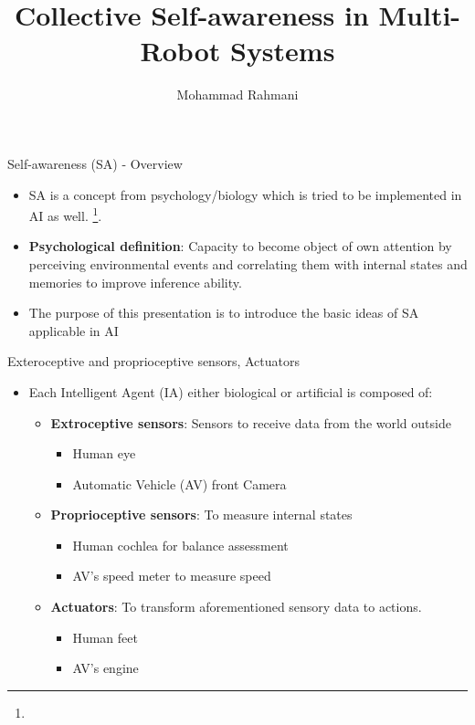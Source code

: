 \documentclass[unknownkeysallowed]{beamer}
\title{Collective Self-awareness in Multi-Robot Systems}
\author{Mohammad Rahmani}
\institute{DECIDE doctoral school}
\begin{document}
\begin{frame}
	\maketitle
\end{frame}

\begin{frame}{Self-awareness (SA) - Overview}
	\begin{itemize}
		\item SA is a concept from psychology/biology which is tried to be implemented in AI as well.  \footnote{\tiny{}}.
		
		\item \textbf{Psychological definition}: Capacity to become object of own attention by perceiving environmental events and correlating them with internal states and memories to improve inference ability.
		
		\item The purpose of this presentation is to introduce the basic ideas of SA applicable in AI
	\end{itemize}
\end{frame}


\begin{frame}{Exteroceptive and proprioceptive sensors, Actuators}
	\begin{itemize}
		\item Each Intelligent Agent (IA) either biological or artificial is composed of:
			\begin{itemize}
				\item \textbf{Extroceptive sensors}: Sensors to receive data from the world outside
					\begin{itemize}
						\item Human eye
						\item Automatic Vehicle (AV) front Camera
					\end{itemize}
				\item \textbf{Proprioceptive sensors}: To measure internal states
					\begin{itemize}
						\item Human cochlea for balance assessment
						\item AV's speed meter to measure speed
					\end{itemize}
				\item \textbf{Actuators}: To transform aforementioned sensory data to actions.
					\begin{itemize}
						\item Human feet
						\item AV's engine
					\end{itemize}
			\end{itemize}
	\end{itemize}
\end{frame}
\end{document}
